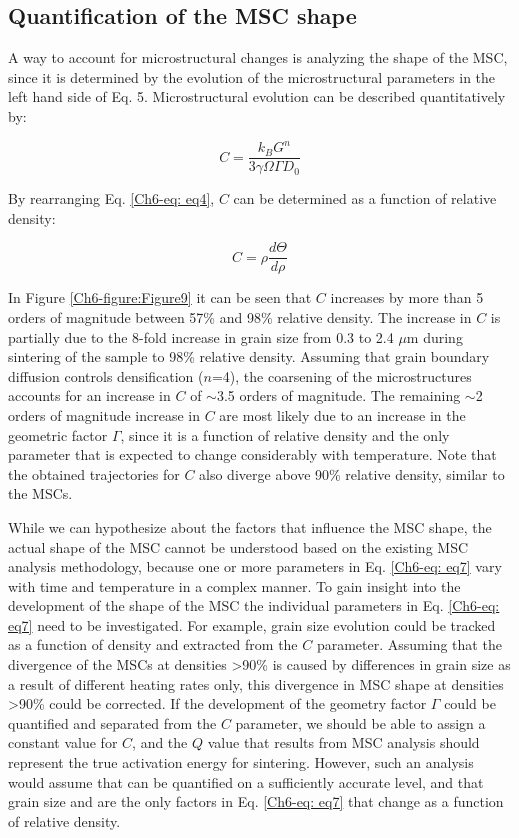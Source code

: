 \subsection{Quantification of the MSC shape}
A way to account for microstructural changes is analyzing the shape of the MSC, since it is determined by the evolution of the microstructural parameters in the left hand side of Eq. 5. Microstructural evolution can be described quantitatively by:

\begin{equation}
\label{Ch6-eq: eq7}
C = \frac{k_{B} G^{n}}{3 \gamma \Omega \Gamma D_{0}}
\end{equation}

\noindent By rearranging Eq. \ref{Ch6-eq: eq4}, $C$ can be determined as a function of relative density:

\begin{equation}
\label{Ch6-eq: eq8}
C = \rho \frac{d \Theta}{d \rho}
\end{equation}

\noindent In Figure \ref{Ch6-figure:Figure9} it can be seen that $C$ increases by more than 5 orders of magnitude between 57\% and 98\% relative density. The increase in $C$ is partially due to the 8-fold increase in grain size from 0.3 to 2.4 $\mu$m during sintering of the sample to 98\% relative density. Assuming that grain boundary diffusion controls densification ($n$=4), the coarsening of the microstructures accounts for an increase in $C$ of $\sim$3.5 orders of magnitude. The remaining $\sim$2 orders of magnitude increase in $C$ are most likely due to an increase in the geometric factor $\Gamma$, since it is a function of relative density and the only parameter that is expected to change considerably with temperature. Note that the obtained trajectories for $C$ also diverge above 90\% relative density, similar to the MSCs.

While we can hypothesize about the factors that influence the MSC shape, the actual shape of the MSC cannot be understood based on the existing MSC analysis methodology, because one or more parameters in Eq. \ref{Ch6-eq: eq7} vary with time and temperature in a complex manner. To gain insight into the development of the shape of the MSC the individual parameters in Eq. \ref{Ch6-eq: eq7} need to be investigated. For example, grain size evolution could be tracked as a function of density and extracted from the $C$ parameter. Assuming that the divergence of the MSCs at densities >90\% is caused by differences in grain size as a result of different heating rates only, this divergence in MSC shape at densities >90\% could be corrected. If the development of the geometry factor $\Gamma$ could be quantified and separated from the $C$ parameter, we should be able to assign a constant value for $C$, and the $Q$ value that results from MSC analysis should represent the true activation energy for sintering. However, such an analysis would assume that  can be quantified on a sufficiently accurate level, and that grain size and  are the only factors in Eq. \ref{Ch6-eq: eq7} that change as a function of relative density.

